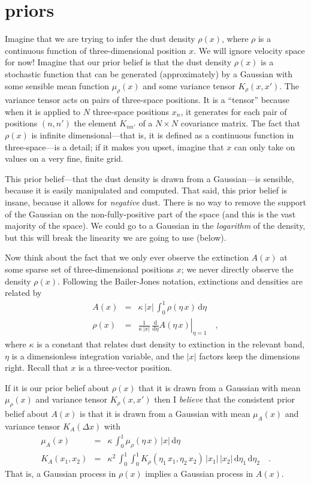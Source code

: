 \documentclass[12pt, letterpaper]{article}
\newcommand{\dd}{\mathrm{d}}
\begin{document}
\section{priors}

Imagine that we are trying to infer the dust density $\rho(x)$, where
$\rho$ is a continuous function of three-dimensional position $x$.
We will ignore velocity space for now!
Imagine that our prior belief is that the dust density $\rho(x)$ is a
stochastic function that can be generated (approximately) by a
Gaussian with some sensible mean function $\mu_\rho(x)$ and some variance
tensor $K_\rho(x, x')$.
The variance tensor acts on pairs of three-space positions.
It is a ``tensor'' because when it is applied to $N$ three-space
positions $x_n$, it generates for each pair of positions $(n, n')$ the
element $K_{nn'}$ of a $N\times N$ covariance matrix.
The fact that $\rho(x)$ is infinite dimensional---that is, it is
defined as a continuous function in three-space---is a detail; if it
makes you upset, imagine that $x$ can only take on values on a very
fine, finite grid.

This prior belief---that the dust density is drawn from a
Gaussian---is sensible, because it is easily manipulated and computed.
That said, this prior belief is insane, because it allows for
\emph{negative} dust.
There is no way to remove the support of the Gaussian on the
non-fully-positive part of the space (and this is the vast majority of
the space).
We could go to a Gaussian in the \emph{logarithm} of the density, but
this will break the linearity we are going to use (below).

Now think about the fact that we only ever observe the extinction
$A(x)$ at some sparse set of three-dimensional positions $x$; we never
directly observe the density $\rho(x)$.
Following the Bailer-Jones notation, extinctions and densities are
related by
\begin{eqnarray}
A(x) &=& \kappa\,|x|\,\int_0^1 \rho(\eta\,x)\,\dd\eta
\\
\rho(x) &=& \frac{1}{\kappa\,|x|}\,\left.\frac{\dd}{\dd\eta}A(\eta\,x)\right|_{\eta=1}
\quad,
\end{eqnarray}
where $\kappa$ is a constant that relates dust density to extinction
in the relevant band, $\eta$ is a dimensionless integration variable,
and the $|x|$ factors keep the dimensions right.
Recall that $x$ is a three-vector position.

If it is our prior belief about $\rho(x)$ that it is drawn from a
Gaussian with mean $\mu_\rho(x)$ and variance tensor $K_\rho(x, x')$ then I
\emph{believe} that the consistent prior belief about $A(x)$ is that
it is drawn from a Gaussian with mean $\mu_A(x)$ and variance tensor
$K_A(\Delta x)$ with
\begin{eqnarray}
\mu_A(x) &=& \kappa\,\int_0^1 \mu_\rho(\eta\,x)\,|x|\,\dd\eta
\\
K_A(x_1, x_2) &=& \kappa^2\,\int_0^1\int_0^1 K_\rho(\eta_1\,x_1, \eta_2\,x_2)\,|x_1|\,|x_2|\,\dd\eta_1\,\dd\eta_2
\quad .
\end{eqnarray}
That is, a Gaussian process in $\rho(x)$ implies a Gaussian process in
$A(x)$.
\end{document}
